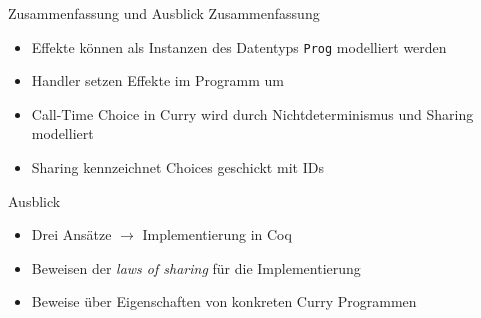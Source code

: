 \documentclass{beamer}
\newcommand{\haskellinline}[1]{\texttt{#1}}
\begin{document}
\begin{frame}[fragile]{Zusammenfassung und Ausblick}
Zusammenfassung
\begin{itemize}
\item Effekte können als Instanzen des Datentyps \haskellinline{Prog} modelliert werden
\item Handler setzen Effekte im Programm um
\item Call-Time Choice in Curry wird durch Nichtdeterminismus und Sharing modelliert
\item Sharing kennzeichnet Choices geschickt mit IDs
\end{itemize}
\vfill
Ausblick
\begin{itemize}
\item Drei Ansätze $\rightarrow$ Implementierung in Coq
\item Beweisen der \textit{laws of sharing} für die Implementierung
\item Beweise über Eigenschaften von konkreten Curry Programmen
\end{itemize}
\end{frame}

\appendix
\end{document}
